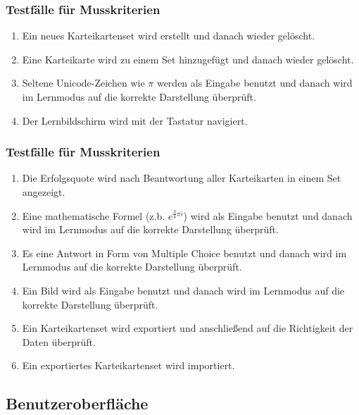 \subsubsection{Testfälle für Musskriterien}
\begin{enumerate}[leftmargin=2cm, label=\bfseries /TM\arabic*0/]
	\item Ein neues Karteikartenset wird erstellt und danach wieder gelöscht.
	\item Eine Karteikarte wird zu einem Set hinzugefügt und danach wieder gelöscht.
	\item Seltene Unicode-Zeichen wie \(\pi\) werden als Eingabe benutzt und danach wird im Lernmodus auf die korrekte Darstellung überprüft.
	\item Der Lernbildschirm wird mit der Tastatur navigiert.
\end{enumerate}

\subsubsection{Testfälle für Musskriterien}
\begin{enumerate}[leftmargin=2cm, label=\bfseries /TW\arabic*0/]
	\item Die Erfolgsquote wird nach Beantwortung aller Karteikarten in einem Set angezeigt.
	\item Eine mathematische Formel (z.b. \( e^{\frac{3}{4}\pi i}\)) wird als Eingabe benutzt und danach wird im Lernmodus auf die korrekte Darstellung überprüft.
	\item Es eine Antwort in Form von Multiple Choice benutzt und danach wird im Lernmodus auf die korrekte Darstellung überprüft.
	\item Ein Bild wird als Eingabe benutzt und danach wird im Lernmodus auf die korrekte Darstellung überprüft.
	\item\label{test-export} Ein Karteikartenset wird exportiert und anschließend auf die Richtigkeit der Daten überprüft.
	\item Ein exportiertes Karteikartenset wird importiert.
\end{enumerate}


\subsection{Benutzeroberfläche}
